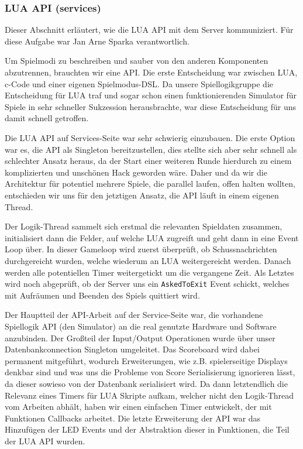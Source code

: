 \subsubsection{LUA API (services)}
\label{sec:services-lua-api}
Dieser Abschnitt erläutert, wie die LUA API mit dem Server kommuniziert. Für diese Aufgabe war Jan Arne Sparka verantwortlich.

Um Spielmodi zu beschreiben und sauber von den anderen Komponenten abzutrennen, brauchten wir eine API. Die erste Entscheidung war zwischen LUA, c-Code und einer eigenen Spielmodus-DSL. Da unsere Spiellogikgruppe die Entscheidung für LUA traf und sogar schon einen funktionierenden Simulator für Spiele in sehr schneller Sukzession herausbrachte, war diese Entscheidung für uns damit schnell getroffen.

Die LUA API auf Services-Seite war sehr schwierig einzubauen. Die erste Option war es, die API als Singleton bereitzustellen, dies stellte sich aber sehr schnell als schlechter Ansatz heraus, da der Start einer weiteren Runde hierdurch zu einem komplizierten und unschönen Hack geworden wäre. Daher und da wir die Architektur für potentiel mehrere Spiele, die parallel laufen, offen halten wollten, entschieden wir uns für den jetztigen Ansatz, die API läuft in einem eigenen Thread. 

Der Logik-Thread sammelt sich erstmal die relevanten Spieldaten zusammen, initialisiert dann die Felder, auf welche LUA zugreift und geht dann in eine Event Loop über. In dieser Gameloop wird zuerst überprüft, ob Schussnachrichten durchgereicht wurden, welche wiederum an LUA weitergereicht werden. Danach werden alle potentiellen Timer weitergetickt um die vergangene Zeit. Als Letztes wird noch abgeprüft, ob der Server uns ein \texttt{AskedToExit} Event schickt, welches mit Aufräumen und Beenden des Spiels quittiert wird.

Der Hauptteil der API-Arbeit auf der Service-Seite war, die vorhandene Spiellogik API (den Simulator) an die real genutzte Hardware und Software anzubinden. Der Großteil der Input/Output Operationen wurde über unser Datenbankconnection Singleton umgeleitet. Das Scoreboard wird dabei permanent mitgeführt, wodurch Erweiterungen, wie z.B. spielerseitige Displays denkbar sind und was uns die Probleme von Score Serialisierung ignorieren lässt, da dieser sowieso von der Datenbank serialisiert wird. Da dann letztendlich die Relevanz eines Timers für LUA Skripte aufkam, welcher nicht den Logik-Thread vom Arbeiten abhält, haben wir einen einfachen Timer entwickelt, der mit Funktionen Callbacks arbeitet. Die letzte Erweiterung der API war das Hinzufügen der LED Events und der Abstraktion dieser in Funktionen, die Teil der LUA API wurden.

